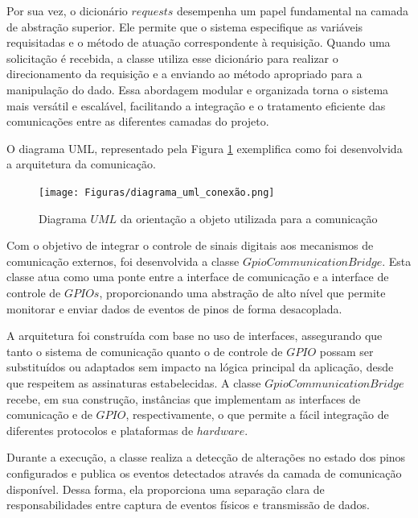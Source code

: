 \documentclass{ecatfg}
\begin{document}
Por sua vez, o dicionário $requests$ desempenha um papel fundamental na camada de abstração superior. Ele permite que o sistema especifique as variáveis requisitadas e o método de atuação correspondente à requisição. Quando uma solicitação é recebida, a classe utiliza esse dicionário para realizar o direcionamento da requisição e a enviando ao método apropriado para a manipulação do dado. Essa abordagem modular e organizada torna o sistema mais versátil e escalável, facilitando a integração e o tratamento eficiente das comunicações entre as diferentes camadas do projeto. \par

O diagrama UML, representado pela Figura \ref{fig:diagrama_uml_conexão} exemplifica como foi desenvolvida a arquitetura da comunicação.
\begin{figure}[!htb]
    \centering
    \texttt{[image: Figuras/diagrama\_uml\_conexão.png]}
    \caption{Diagrama $UML$ da orientação a objeto utilizada para a comunicação}
    \label{fig:diagrama_uml_conexão}
\end{figure}

Com o objetivo de integrar o controle de sinais digitais aos mecanismos de comunicação externos, foi desenvolvida a classe $GpioCommunicationBridge$. Esta classe atua como uma ponte entre a interface de comunicação e a interface de controle de $GPIOs$, proporcionando uma abstração de alto nível que permite monitorar e enviar dados de eventos de pinos de forma desacoplada.\par

A arquitetura foi construída com base no uso de interfaces, assegurando que tanto o sistema de comunicação quanto o de controle de $GPIO$ possam ser substituídos ou adaptados sem impacto na lógica principal da aplicação, desde que respeitem as assinaturas estabelecidas. A classe $GpioCommunicationBridge$ recebe, em sua construção, instâncias que implementam as interfaces de comunicação e de $GPIO$, respectivamente, o que permite a fácil integração de diferentes protocolos e plataformas de $hardware$.\par

Durante a execução, a classe realiza a detecção de alterações no estado dos pinos configurados e publica os eventos detectados através da camada de comunicação disponível. Dessa forma, ela proporciona uma separação clara de responsabilidades entre captura de eventos físicos e transmissão de dados.\par
\end{document}
